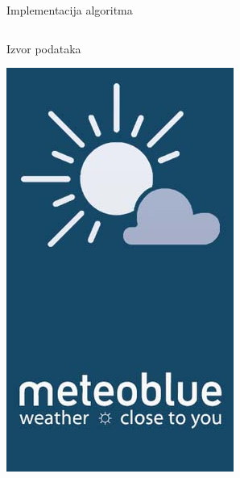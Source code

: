 \documentclass{beamer}
\begin{document}
\begin{frame}{Implementacija algoritma}
\begin{columns}
\begin{block}{Izvor podataka}
\begin{center}
                \href{https://www.meteoblue.com/en/weather/archive/export/basel_switzerland_2661604}{\includegraphics[scale=0.3]{presentation/1_meteoblue.jpg}}
            \end{center}
        \end{block}
    \end{columns}
\end{frame}
\end{document}

